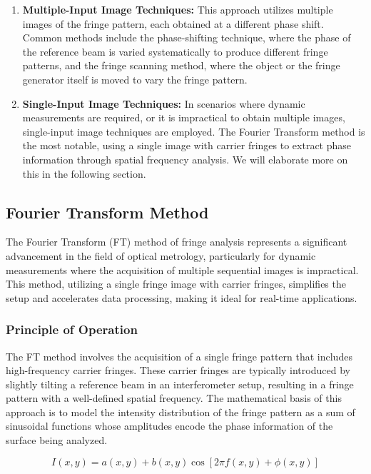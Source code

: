 \documentclass[../main.tex]{subfiles}
\begin{document}
\begin{enumerate}
    \item \textbf{Multiple-Input Image Techniques:} This approach utilizes multiple images of the fringe pattern, each obtained at a different phase shift. Common methods include the phase-shifting technique, where the phase of the reference beam is varied systematically to produce different fringe patterns, and the fringe scanning method, where the object or the fringe generator itself is moved to vary the fringe pattern.
    \item \textbf{Single-Input Image Techniques:} In scenarios where dynamic measurements are required, or it is impractical to obtain multiple images, single-input image techniques are employed. The Fourier Transform method is the most notable, using a single image with carrier fringes to extract phase information through spatial frequency analysis. We will elaborate more on this in the following section.
\end{enumerate}

\subsection{Fourier Transform Method}
The Fourier Transform (FT) method of fringe analysis represents a significant advancement in the field of optical metrology, particularly for dynamic measurements where the acquisition of multiple sequential images is impractical. This method, utilizing a single fringe image with carrier fringes, simplifies the setup and accelerates data processing, making it ideal for real-time applications.

\subsubsection{Principle of Operation}
The FT method involves the acquisition of a single fringe pattern that includes high-frequency carrier fringes. These carrier fringes are typically introduced by slightly tilting a reference beam in an interferometer setup, resulting in a fringe pattern with a well-defined spatial frequency. The mathematical basis of this approach is to model the intensity distribution of the fringe pattern as a sum of sinusoidal functions whose amplitudes encode the phase information of the surface being analyzed.

\begin{equation}
    I(x, y) = a(x, y) + b(x, y) \cos[2\pi f(x, y) + \phi(x, y)]
\end{equation}
\end{document}

